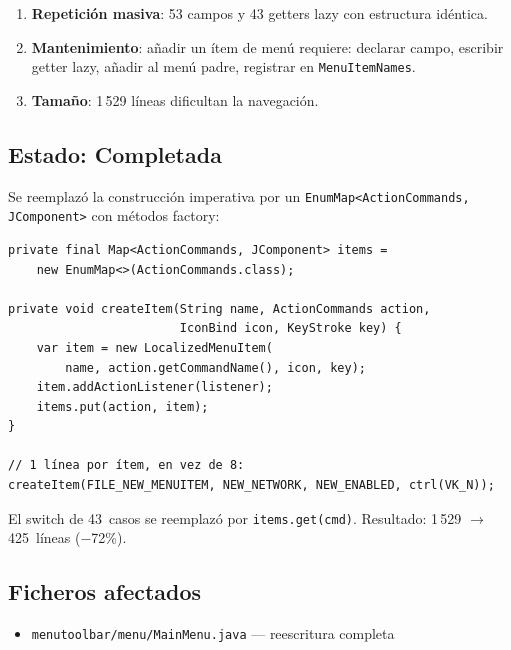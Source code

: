 \documentclass[12pt,a4paper]{article}
\newcommand{\code}[1]{\texttt{#1}}
\newcommand{\clase}[1]{\texttt{#1}}
\newcommand{\bad}[1]{\textcolor{codered}{\textbf{#1}}}
\newcommand{\warn}[1]{\textcolor{warnorange}{\textbf{#1}}}
\begin{document}
\begin{enumerate}
  \item \bad{Repetición masiva}: 53 campos y 43 getters lazy con
        estructura idéntica.
  \item \warn{Mantenimiento}: añadir un ítem de menú requiere:
        declarar campo, escribir getter lazy, añadir al menú padre,
        registrar en \clase{MenuItemNames}.
  \item \warn{Tamaño}: 1\,529 líneas dificultan la navegación.
\end{enumerate}

\subsection{Estado: Completada}

Se reemplazó la construcción imperativa por un
\code{EnumMap<ActionCommands, JComponent>} con métodos factory:

\begin{lstlisting}[caption={Solución aplicada: factory + EnumMap}]
private final Map<ActionCommands, JComponent> items =
    new EnumMap<>(ActionCommands.class);

private void createItem(String name, ActionCommands action,
                        IconBind icon, KeyStroke key) {
    var item = new LocalizedMenuItem(
        name, action.getCommandName(), icon, key);
    item.addActionListener(listener);
    items.put(action, item);
}

// 1 línea por ítem, en vez de 8:
createItem(FILE_NEW_MENUITEM, NEW_NETWORK, NEW_ENABLED, ctrl(VK_N));
\end{lstlisting}

El switch de 43~casos se reemplazó por \code{items.get(cmd)}.
Resultado: 1\,529 $\to$ 425~líneas ($-$72\%).

\subsection{Ficheros afectados}

\begin{itemize}[nosep]
  \item \code{menutoolbar/menu/MainMenu.java} --- reescritura completa
\end{itemize}
\end{document}
